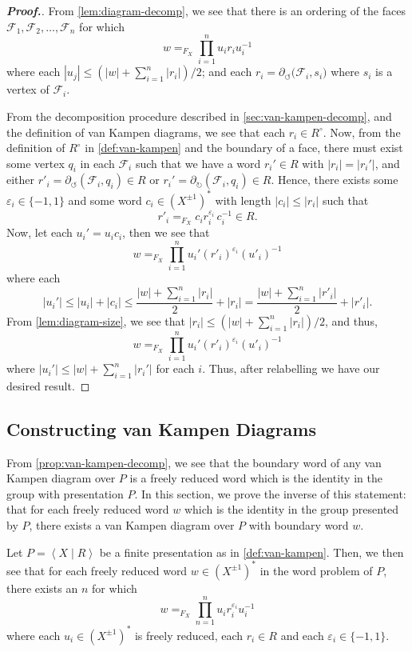 \documentclass[11pt,a4paper,reqno]{amsart}
\theoremstyle{plain}
\theoremstyle{definition}
\theoremstyle{definition}
\renewcommand\leq\leqslant
\newenvironment{myproof}{\begin{proof}[\normalfont\bfseries Proof.]}{\end{proof}}
\begin{document}
\begin{myproof}
	From \cref{lem:diagram-decomp}, we see that there is an ordering of the faces $\mathcal F_1, \mathcal F_2,\ldots,\mathcal F_n$ for which
	\[
		w
		=_{F_X}
		\prod_{i=1}^{n}
		u_i r_i u_{i}^{-1}
	\]
	where
	each $|u_j|\leq (|w|+\sum_{i=1}^n |r_i|)/2$;
	and each $r_i  = \partial_{\circlearrowleft} \mathcal (\mathcal F_i,s_i)$ where $s_i$ is a vertex of $\mathcal F_i$.

	From the decomposition procedure described in \cref{sec:van-kampen-decomp}, and the definition of van Kampen diagrams, we see that each $r_i \in R^\circ$.
	Now, from the definition of $R^\circ$ in \cref{def:van-kampen} and the boundary of a face, there must exist some vertex $q_i$ in each $\mathcal F_i$ such that we have a word $r_i'\in R$ with $|r_i|=|r_i'|$, and either $r'_i = \partial_\circlearrowleft (\mathcal F_i, q_i)\in R$ or $r_i' = \partial_\circlearrowright (\mathcal F_i, q_i)\in R$.
	Hence, there exists some $\varepsilon_i \in \{-1,1\}$ and some word $c_i \in (X^{\pm 1})^*$ with length $|c_i|\leq |r_i|$ such that
	\[
		r'_i =_{F_X} c_i r_i^{\varepsilon_i}\, c_i^{-1} \in R.
	\]
	Now, let each $u_i' = u_i c_i$, then we see that
	\[
		w
		=_{F_X}
		\prod_{i=1}^{n}
		u_i' (r'_i)^{\varepsilon_i} (u'_{i})^{-1}
	\]
	where each
	\[
		|u_i'|\leq |u_i|+|c_i| \leq \frac{|w|+\sum_{i=1}^n |r_i|}{2} + |r_i|
		=
		\frac{|w|+\sum_{i=1}^n |r'_i|}{2} + |r'_i|
		.
	\]
	From \cref{lem:diagram-size}, we see that $|r_i|\leq (|w|+\sum_{i=1}^n |r_i|)/2$, and thus,
	\[
		w
		=_{F_X}
		\prod_{i=1}^{n}
		u_i' (r'_i)^{\varepsilon_i} (u'_{i})^{-1}
	\]
	where $|u_i'| \leq |w|+\sum_{i=1}^n |r_i'|$ for each $i$.
	Thus, after relabelling we have our desired result.
\end{myproof}


\subsection{Constructing van Kampen Diagrams}\label{sec:van-kampen-construct}

From \cref{prop:van-kampen-decomp}, we see that the boundary word of any van Kampen diagram over $P$ is a freely reduced word which is the identity in the group with presentation $P$.
In this section, we prove the inverse of this statement: that for each freely reduced word $w$ which is the identity in the group presented by $P$, there exists a van Kampen diagram over $P$ with boundary word $w$.

Let $P = \left\langle X\mid R\right\rangle$ be a finite presentation as in \cref{def:van-kampen}.
Then, we then see that for each freely reduced word $w \in (X^{\pm 1})^*$ in the word problem of $P$, there exists an $n$ for which
\begin{equation}\label{eq:tirivial-word}
	w
	=_{F_X}
	\prod_{n=1}^n
	u_i r_i^{\varepsilon_i} u_i^{-1}
\end{equation}
where each $u_i \in (X^{\pm 1})^*$ is freely reduced, each $r_i \in R$ and each $\varepsilon_i \in \{-1,1\}$.
\end{document}
